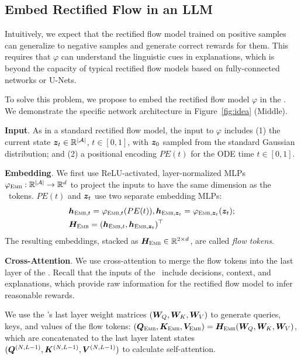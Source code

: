 \subsection{Embed Rectified Flow in an LLM}

Intuitively, we expect that the rectified flow model trained on positive samples can generalize to negative samples and generate correct rewards for them. This requires that $\varphi$ can understand the linguistic cues in explanations, which is beyond the capacity of typical rectified flow models based on fully-connected networks or U-Nets.

To solve this problem, we propose to embed the rectified flow model $\varphi$ in the \rlm. We demonstrate the specific network architecture in Figure~\ref{fig:idea} (Middle).

\textbf{Input}. As in a standard rectified flow model, the input to $\varphi$ includes (1) the current state ${\bm{z}}_t\in\mathbb{R}^{|\mathcal{A}|}$, $t\in[0,1]$, with ${\bm{z}}_0$ sampled from the standard Gaussian distribution; and (2) a positional encoding $PE(t)$ for the ODE time $t\in[0,1]$.

\textbf{Embedding}. We first use ReLU-activated, layer-normalized MLPs $\varphi_{\textsc{Emb}}:\mathbb{R}^{|\mathcal{A}|}\rightarrow\mathbb{R}^d$ to project the inputs to have the same dimension as the \rlm~tokens. $PE(t)$ and ${\bm{z}}_t$ use two separate embedding MLPs:
\begin{align}
    &{\bm{h}}_{\textsc{Emb},t} = \varphi_{\textsc{Emb},t}(PE(t)),{\bm{h}}_{\textsc{Emb},{\bm{z}}_t} = \varphi_{\textsc{Emb},{\bm{z}}_t}({\bm{z}}_t);\\
    &{\bm{H}}_{\textsc{Emb}} = ({\bm{h}}_{\textsc{Emb},t},{\bm{h}}_{\textsc{Emb},{\bm{z}}_t})^\top
\end{align}
The resulting embeddings, stacked as ${\bm{H}}_{\textsc{Emb}}\in\mathbb{R}^{2\times d}$, are called \emph{flow tokens}.

\textbf{Cross-Attention}. We use cross-attention to merge the flow tokens into the last layer of the \rlm. Recall that the inputs of the \rlm~include decisions, context, and explanations, which provide raw information for the rectified flow model to infer reasonable rewards.

We use the \rlm's last layer weight matrices $({\bm{W}}_Q, {\bm{W}}_K, {\bm{W}}_V)$ to generate queries, keys, and values of the flow tokens: $({\bm{Q}}_{\textsc{Emb}}, {\bm{K}}_{\textsc{Emb}}, {\bm{V}}_{\textsc{Emb}}) = {\bm{H}}_{\textsc{Emb}} ({\bm{W}}_Q, {\bm{W}}_K, {\bm{W}}_V)$,
which are concatenated to the last layer latent states $(\idx[\mQ][][N,L-1], \idx[\mK][][N,L-1], \idx[\mV][][N,L-1])$ to calculate self-attention.

